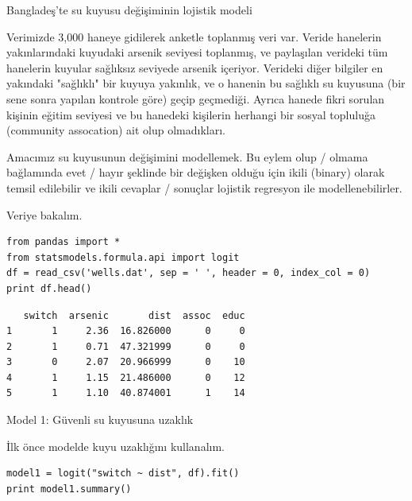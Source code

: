 \documentclass[12pt,fleqn]{article}\usepackage{../../common}
\begin{document}
Bangladeş'te su kuyusu değişiminin lojistik modeli

Verimizde 3,000 haneye gidilerek anketle toplanmış veri var. Veride hanelerin
yakınlarındaki kuyudaki arsenik seviyesi toplanmış, ve paylaşılan verideki tüm
hanelerin kuyular sağlıksız seviyede arsenik içeriyor. Verideki diğer bilgiler
en yakındaki "sağlıklı" bir kuyuya yakınlık, ve o hanenin bu sağlıklı su
kuyusuna (bir sene sonra yapılan kontrole göre) geçip geçmediği.  Ayrıca hanede
fikri sorulan kişinin eğitim seviyesi ve bu hanedeki kişilerin herhangi bir
sosyal topluluğa (community assocation) ait olup olmadıkları.

Amacımız su kuyusunun değişimini modellemek. Bu eylem olup / olmama bağlamında
evet / hayır şeklinde bir değişken olduğu için ikili (binary) olarak temsil
edilebilir ve ikili cevaplar / sonuçlar lojistik regresyon ile
modellenebilirler.

Veriye bakalım.

\begin{verbatim}
from pandas import *
from statsmodels.formula.api import logit
df = read_csv('wells.dat', sep = ' ', header = 0, index_col = 0)
print df.head()
\end{verbatim}

\begin{verbatim}
   switch  arsenic       dist  assoc  educ
1       1     2.36  16.826000      0     0
2       1     0.71  47.321999      0     0
3       0     2.07  20.966999      0    10
4       1     1.15  21.486000      0    12
5       1     1.10  40.874001      1    14
\end{verbatim}

Model 1: Güvenli su kuyusuna uzaklık

İlk önce modelde kuyu uzaklığını kullanalım. 

\begin{verbatim}
model1 = logit("switch ~ dist", df).fit()
print model1.summary()
\end{verbatim}
\end{document}
